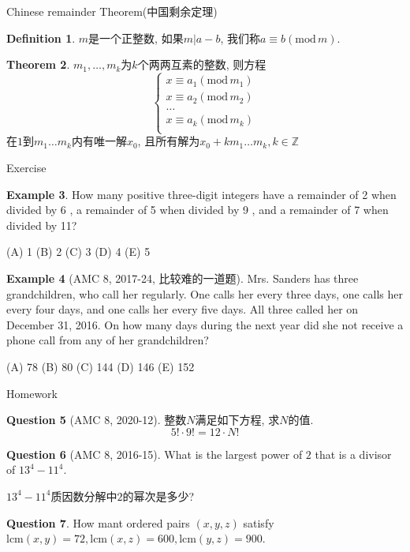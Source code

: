 \documentclass{beamer}
\theoremstyle{definition}
\newtheorem{defn}{Definition}[section]
\newtheorem{theo}[defn]{Theorem}
\newtheorem{exam}[defn]{Example}
\newtheorem{ques}[defn]{Question}
\newcommand{\bb}[1]{\mathbb{#1}}
\renewcommand{\mod}[1]{(\text{mod}\,#1)}
\begin{document}
\begin{frame}{Chinese remainder Theorem(中国剩余定理)}
    \begin{defn}
        $m$是一个正整数, 如果$m|a-b$, 我们称$a\equiv b\mod{m}$.
    \end{defn}
    \begin{theo}
        $m_1,\dots,m_k$为$k$个两两互素的整数, 则方程
        \begin{equation*}
            \begin{cases}
                  x\equiv a_1\mod{m_1}\\ 
                  x\equiv a_2\mod{m_2}\\ 
                  \dots \\ 
                  x\equiv a_k\mod{m_k}\\ 
            \end{cases}
        \end{equation*}
        在$1$到$m_1\dots m_k$内有唯一解$x_0$, 且所有解为$x_0+km_1\dots m_k,k\in \bb{Z}$
    \end{theo}
\end{frame}
\begin{frame}{Exercise}
\begin{exam}
    How many positive three-digit integers have a remainder of 2 when divided by 6 , a remainder of 5 when divided by 9 , and a remainder of 7 when divided by 11?
    
    (A) 1 (B) 2 (C) 3 (D) 4 (E) 5
\end{exam}
\begin{exam}[AMC 8, 2017-24, 比较难的一道题]
    Mrs. Sanders has three grandchildren, who call her regularly. One calls her every three days, one calls her every four days, and one calls her every five days. All three called her on December 31, 2016. On how many days during the next year did she not receive a phone call from any of her grandchildren?
    
    (A) 78 (B) 80 (C) 144 (D) 146 (E) 152
\end{exam}
  
\end{frame}


\begin{frame}{Homework}
\begin{ques}[AMC 8, 2020-12]
    整数$N$满足如下方程, 求$N$的值.
    $$
        5!\cdot 9!=12 \cdot N!
    $$
\end{ques}
\begin{ques}[AMC 8, 2016-15]
    What is the largest power of $2$ that is a divisor of $13^4-11^4$.

    $13^4-11^4$质因数分解中$2$的幂次是多少?
\end{ques}
\begin{ques}
    How mant ordered pairs $(x,y,z)$ satisfy $\text{lcm}(x,y)=72, \text{lcm}(x,z)=600, \text{lcm}(y,z)=900$.
\end{ques}
\end{frame}
\end{document}
